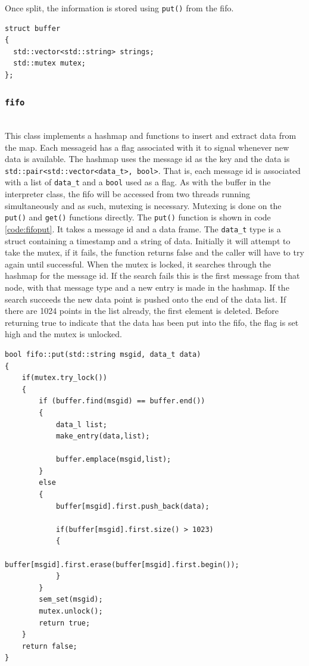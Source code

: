 Once split, the information is stored using \texttt{put()} from the fifo. 
\begin{lstlisting}[caption=Buffer for holding incoming messages,label=code:msgbuffer]
struct buffer 
{
  std::vector<std::string> strings;
  std::mutex mutex;
};
\end{lstlisting}
\subsubsection{\texttt{fifo}}~\\
This class implements a hashmap and functions to insert and extract data from the map.
Each messageid has a flag associated with it to signal whenever new data is available.
The hashmap uses the message id as the key and the data is \texttt{std::pair<std::vector<data\_t>, bool>}.
That is, each message id is associated with a list of \texttt{data\_t} and a \texttt{bool} used as a flag.
As with the buffer in the interpreter class, the fifo will be accessed from two threads running simultaneously and as such, mutexing is necessary.
Mutexing is done on the \texttt{put()} and \texttt{get()} functions directly.
The \texttt{put()} function is shown in code \ref{code:fifoput}.
It takes a message id and a data frame.
The \texttt{data\_t} type is a struct containing a timestamp and a string of data.
Initially it will attempt to take the mutex, if it fails, the function returns false and the caller will have to try again until successful.
When the mutex is locked, it searches through the hashmap for the message id.
If the search fails this is the first message from that node, with that message type and a new entry is made in the hashmap.
If the search succeeds the new data point is pushed onto the end of the data list.
If there are 1024 points in the list already, the first element is deleted.
Before returning true to indicate that the data has been put into the fifo, the flag is set high and the mutex is unlocked.

\begin{lstlisting}[caption=Function used to insert new data into the hashmap,label=code:fifoput]
bool fifo::put(std::string msgid, data_t data)
{
	if(mutex.try_lock())
	{	
		if (buffer.find(msgid) == buffer.end())
		{
			data_l list;
			make_entry(data,list);

			buffer.emplace(msgid,list);
		}
		else
		{
			buffer[msgid].first.push_back(data);
			
			if(buffer[msgid].first.size() > 1023)
			{
				buffer[msgid].first.erase(buffer[msgid].first.begin());
			}
		}
		sem_set(msgid);
		mutex.unlock();
		return true;
	}
	return false;
}
\end{lstlisting}

